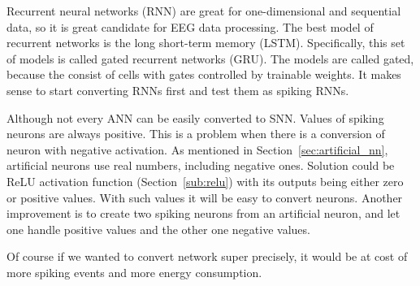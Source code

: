 Recurrent neural networks (RNN) are great for one-dimensional and sequential data, so it is great candidate for EEG data processing. The best model of recurrent networks is the long short-term memory (LSTM). Specifically, this set of models is called gated recurrent networks (GRU). The models are called gated, because the consist of cells with gates controlled by trainable weights. It makes sense to start converting RNNs first and test them as spiking RNNs.

Although not every ANN can be easily converted to SNN. Values of spiking neurons are always positive. This is a problem when there is a conversion of neuron with negative activation. As mentioned in Section~\ref{sec:artificial_nn}, artificial neurons use real numbers, including negative ones. Solution could be ReLU activation function (Section~\ref{sub:relu}) with its outputs being either zero or positive values. With such values it will be easy to convert neurons. Another improvement is to create two spiking neurons from an artificial neuron, and let one handle positive values and the other one negative values. \cite{2ann-for-1snn-neuron}

Of course if we wanted to convert network super precisely, it would be at cost of more spiking events and more energy consumption.

